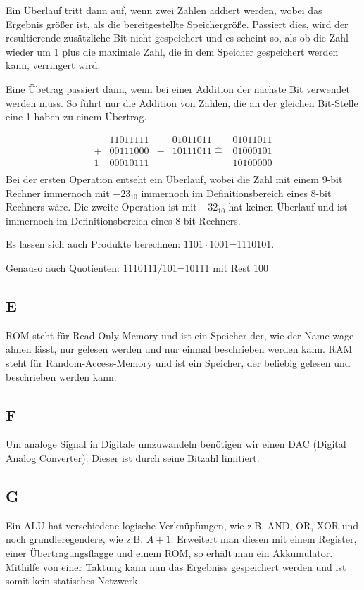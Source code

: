 \documentclass[10pt]{article}
\begin{document}
\begin{multicols}{2}
	Ein Überlauf tritt dann auf, wenn zwei Zahlen addiert werden, wobei das Ergebnis größer ist, als die bereitgestellte Speichergröße. Passiert dies, wird der resultierende zusätzliche Bit nicht gespeichert und es scheint so, als ob die Zahl wieder um 1 plus die maximale Zahl, die in dem Speicher gespeichert werden kann, verringert wird.

	Eine Übetrag passiert dann, wenn bei einer Addition der nächste Bit verwendet werden muss. So führt nur die Addition von Zahlen, die an der gleichen Bit-Stelle eine 1 haben zu einem Übertrag.

	\begin{align*}
		  & 11011111 &   & 01011011         & 01011011 \\
		+ & 00111000 & - & 10111011 \hat{=} & 01000101 \\
		\hline
		1 & 00010111 &   &                  & 10100000 \\
	\end{align*}
	Bei der ersten Operation entseht ein Überlauf, wobei die Zahl mit einem 9-bit Rechner immernoch mit $-23_{10}$ immernoch im Definitionsbereich eines 8-bit Rechners wäre. Die zweite Operation ist mit $-32_{10}$ hat keinen Überlauf und ist immernoch im Definitionsbereich eines 8-bit Rechners.

	Es lassen sich auch Produkte berechnen: $1101 \cdot 1001$=1110101.

	Genauso auch Quotienten: $1110111 / 101$=10111 mit Rest 100
	\subsection*{E}
	ROM steht für Read-Only-Memory und ist ein Speicher der, wie der Name wage ahnen lässt, nur gelesen werden und nur einmal beschrieben werden kann. RAM steht für Random-Access-Memory und ist ein Speicher, der beliebig gelesen und beschrieben werden kann.
	\subsection*{F}
	Um analoge Signal in Digitale umzuwandeln benötigen wir einen DAC (Digital Analog Converter). Dieser ist durch seine Bitzahl limitiert.
	\subsection*{G}
	Ein ALU hat verschiedene logische Verknüpfungen, wie z.B. AND, OR, XOR und noch grundleregendere, wie z.B. $A+1$. Erweitert man diesen mit einem Register, einer Übertragungsflagge und einem ROM, so erhält man ein Akkumulator. Mithilfe von einer Taktung kann nun das Ergebniss gespeichert werden und ist somit kein statisches Netzwerk.

\end{multicols}
\end{document}
